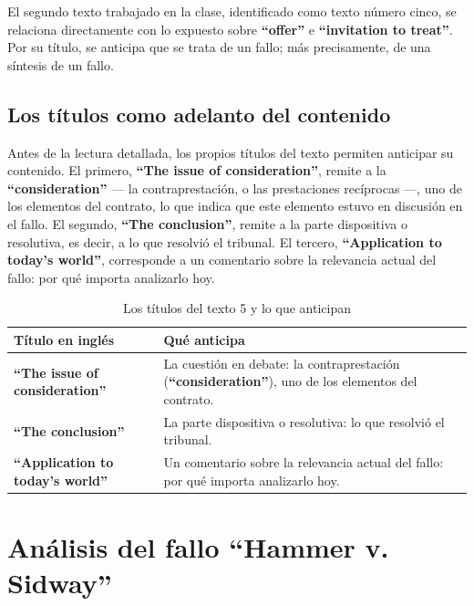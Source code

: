 \documentclass[12pt,oneside]{book}
\begin{document}
El segundo texto trabajado en la clase, identificado como texto número cinco, se relaciona directamente con lo expuesto sobre \textbf{``offer''} e \textbf{``invitation to treat''}. Por su título, se anticipa que se trata de un fallo; más precisamente, de una síntesis de un fallo.

\subsection{Los títulos como adelanto del contenido}

Antes de la lectura detallada, los propios títulos del texto permiten anticipar su contenido. El primero, \textbf{``The issue of consideration''}, remite a la \textbf{``consideration''} --- la contraprestación, o las prestaciones recíprocas ---, uno de los elementos del contrato, lo que indica que este elemento estuvo en discusión en el fallo. El segundo, \textbf{``The conclusion''}, remite a la parte dispositiva o resolutiva, es decir, a lo que resolvió el tribunal. El tercero, \textbf{``Application to today's world''}, corresponde a un comentario sobre la relevancia actual del fallo: por qué importa analizarlo hoy.

\begin{table}[H]
\centering
\caption{Los títulos del texto 5 y lo que anticipan}
\begin{tabularx}{\textwidth}{
    >{\raggedright\arraybackslash}p{}
    >{\raggedright\arraybackslash}X
}
\toprule
\textbf{Título en inglés} & \textbf{Qué anticipa} \\
\midrule
\textbf{``The issue of consideration''} & La cuestión en debate: la contraprestación (\textbf{``consideration''}), uno de los elementos del contrato. \\
\textbf{``The conclusion''} & La parte dispositiva o resolutiva: lo que resolvió el tribunal. \\
\textbf{``Application to today's world''} & Un comentario sobre la relevancia actual del fallo: por qué importa analizarlo hoy. \\
\bottomrule
\end{tabularx}
\end{table}

\section{\texorpdfstring{Análisis del fallo ``Hammer v. Sidway''}{Análisis del fallo Hammer v. Sidway}}
\end{document}
